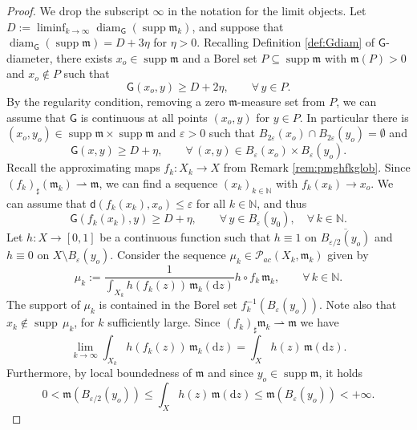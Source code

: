 \documentclass[11pt,a4paper]{article}
\theoremstyle{plain}
\theoremstyle{definition}
\theoremstyle{remark}
\numberwithin{equation}{section}
\newcommand{\N}{\mathbb{N}} %
\newcommand{\red}{\color{red}}
\DeclareMathOperator{\supp}{\mathrm{supp}}
\newcommand{\ve}{\varepsilon}
\DeclareMathOperator{\diam}{\mathrm{diam}}
\newcommand{\di}{\mathrm{d}}
\newcommand{\mm}{\mathfrak m}
\newcommand{\sfd}{\mathsf d}
\newcommand{\sfG}{\mathsf G}
\begin{document}
\begin{proof}
We drop the subscript $\infty$ in the notation for the limit objects. Let $D:=\liminf_{k\to \infty} \diam_{\sfG}(\supp\mm_k)$, and suppose that $\diam_{\sfG}(\supp\mm)=D+3\eta$ for $\eta>0$. Recalling Definition \ref{def:Gdiam} of $\sfG$-diameter, there exists $x_o\in \supp\mm$ and a Borel set $P\subseteq \supp\mm$ with $\mm(P)>0$  and $x_o\notin P$ such that
\begin{equation}
\sfG(x_o,y) \geq D +2\eta, \qquad \forall\, y \in P.
\end{equation}
By the regularity condition, removing a zero $\mm$-measure set from $P$, we can assume that $\sfG$ is continuous at all points $(x_o,y)$ for $y\in P$. In particular there is $(x_o,y_o)\in \supp\mm\times \supp\mm$ and $\ve>0$ such that  $B_{2\ve}(x_o)\cap B_{2\ve}(y_o)=\emptyset$ and 
\begin{equation}
\sfG(x,y) \geq D +\eta, \qquad \forall\, (x,y)\in B_\ve(x_o)\times B_\ve(y_o).
\end{equation}
Recall the approximating maps $f_k:X_k\to X$ from Remark \ref{rem:pmghfkglob}. 
Since $(f_k)_\sharp(\mm_k)\rightharpoonup \mm$, we can find a sequence $(x_k)_{k\in \N}$ with $f_k(x_k) \to x_o$. We can assume that $\sfd(f_k(x_k),x_o)\leq \ve$ for all $k\in \N$, and thus
\begin{equation}\label{eq:geq}
\sfG(f_k(x_k),y) \geq D + \eta ,\qquad \forall\, y \in B_\ve(y_0),\quad \forall\, k\in\N.
\end{equation}
Let $h:X\to [0,1]$ be a continuous function such that $h\equiv 1$ on $\overline{B_{\ve/2}(y_o)}$ and $h\equiv 0$ on $X\setminus B_{\ve}(y_o)$. Consider the sequence $\mu_k \in \mathcal{P}_{ac}(X_k,\mm_k)$ given by
\begin{equation}
\mu_k:=\frac{1}{\int_{X_k} h(f_k(z))\,\mm_k(\di z)} h\circ f_k\, \mm_k, \qquad \forall\, k\in \N.
\end{equation}
The support of $\mu_k$ is contained in the Borel set $f_k^{-1}(B_\ve(y_o))$. 
Note also that  $x_k\notin \supp\, \mu_k$, for $k$ sufficiently large. Since $(f_k)_\sharp\mm_k\rightharpoonup\mm$ we have
\begin{equation}
\lim_{k \to \infty} \int_{X_k} h(f_k(z))\,\mm_k(\di z) = \int_X h(z)\, \mm(\di z).
\end{equation}
Furthermore, by local boundedness of $\mm$ and since $y_o\in\supp\mm$, it holds
\begin{equation}
0<\mm(B_{\ve/2}(y_o)) \leq \int_X h(z)\, \mm(\di z) \leq \mm(B_{\ve}(y_o)) <+\infty.
\end{equation}


\end{proof}
\end{document}

